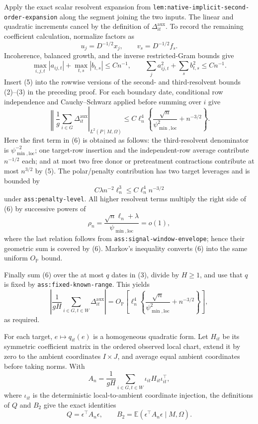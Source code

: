 Apply the exact scalar resolvent expansion from \texttt{lem:native-implicit-second-order-expansion} along the segment joining the two inputs.  The linear and quadratic increments cancel by the definition of \(\Delta^{\mathrm{aux}}_{it}\).  To record the remaining coefficient calculation, normalize factors as
\[
 u_j=D^{-1/2}x_j,
 \qquad v_s=D^{-1/2}f_s.
\]
Incoherence, balanced growth, and the inverse restricted-Gram bounds give
\[
 \max_{i,j,t}|a_{ij,t}|+\max_{t,s}|b_{t,s}|\le Cn^{-1},
 \qquad
 \sum_j a_{ij,t}^2+\sum_s b_{t,s}^2\le Cn^{-1}.
 \tag{5}
\]
Insert (5) into the rowwise versions of the second- and third-resolvent bounds (2)--(3) in the preceding proof.  For each boundary date, conditional row independence and Cauchy--Schwarz applied before summing over \(i\) give
\[
 \left\|
  \frac1g\sum_{i\in G}\Delta^{\mathrm{aux}}_{it}
 \right|_{L^2(P\mid M,\Omega)}
 \le C\ell_n^4
 \left\{\frac{\sqrt n}{\psi_{\min,\mathrm{loc}}^2}
              +n^{-3/2}\right\}.
 \tag{6}
\]
Here the first term in (6) is obtained as follows: the third-resolvent denominator is \(\psi_{\min,\mathrm{loc}}^{-2}\); one target-row insertion and the independent-row average contribute \(n^{-1/2}\) each; and at most two free donor or pretreatment contractions contribute at most \(n^{3/2}\) by (5).  The polar/penalty contribution has two target leverages and is bounded by
\[
 C\lambda n^{-2}\ell_n^3
 \le C\ell_n^4n^{-3/2}
 \tag{7}
\]
under \texttt{ass:penalty-level}.  All higher resolvent terms multiply the right side of (6) by successive powers of
\[
 \rho_n=\frac{\sqrt n\ell_n+\lambda}{\psi_{\min,\mathrm{loc}}}=o(1),
\]
where the last relation follows from \texttt{ass:signal-window-envelope}; hence their geometric sum is covered by (6).  Markov's inequality converts (6) into the same uniform \(O_{\mathbb P}\) bound.

Finally sum (6) over the at most \(q\) dates in (3), divide by \(H\ge1\), and use that \(q\) is fixed by \texttt{ass:fixed-known-range}.  This yields
\[
 \left|\frac1{gH}\sum_{i\in G,t\in W}\Delta^{\mathrm{aux}}_{it}\right|
 =O_{\mathbb P}\!\left[
 \ell_n^4\left\{\frac{\sqrt n}{\psi_{\min,\mathrm{loc}}^2}
 +n^{-3/2}\right\}\right],
\]
as required.

For each target, \(e\mapsto q_{it}(e)\) is a homogeneous quadratic form.  Let \(H_{it}\) be its symmetric coefficient matrix in the ordered observed local chart, extend it by zero to the ambient coordinates \(I\times J\), and average equal ambient coordinates before taking norms.  With
\[
 A_n=\frac1{gH}\sum_{i\in G,t\in W}\iota_{it}H_{it}\iota_{it}^{\top},
\]
where \(\iota_{it}\) is the deterministic local-to-ambient coordinate injection, the definitions of \(Q\) and \(B_2\) give the exact identities
\[
 Q=\epsilon^{\top}A_n\epsilon,
 \qquad
 B_2=\mathbb E(\epsilon^{\top}A_n\epsilon\mid M,\Omega).
 \tag{1}
\]

